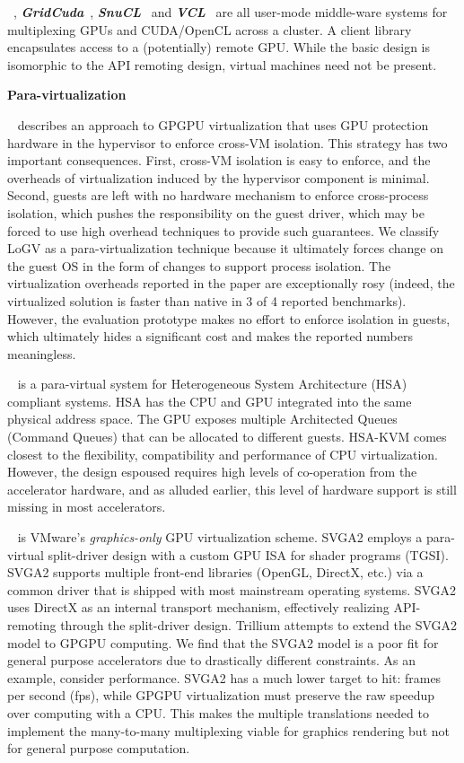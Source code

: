 ~\cite{rCUDA, rCUDAnew},
\textbf{\textit{GridCuda}}~\cite{GridCuda},
\textbf{\textit{SnuCL}}~\cite{kim2012snucl} and
\textbf{\textit{VCL}}~\cite{VCL} are all user-mode middle-ware systems for
multiplexing GPUs and CUDA/OpenCL across a cluster. A client library
encapsulates access to a (potentially) remote GPU. While the basic design is
isomorphic to the API remoting design, virtual machines need not be present.

{\noindent \bf \large Para-virtualization}

~\cite{logv} describes an approach to GPGPU virtualization
that uses GPU protection hardware in the hypervisor to enforce cross-VM
isolation. This strategy has two important consequences. First, cross-VM
isolation is easy to enforce, and the overheads of virtualization induced by
the hypervisor component is minimal. Second, guests are left with no hardware
mechanism to enforce cross-process isolation, which pushes the responsibility
on the guest driver, which may be forced to use high overhead techniques to
provide such guarantees. We classify LoGV as a para-virtualization technique
because it ultimately forces change on the guest OS in the form of changes to
support process isolation. The virtualization overheads reported in the paper
are exceptionally rosy (indeed, the virtualized solution is faster than native
in 3 of 4 reported benchmarks). However, the evaluation prototype makes no
effort to enforce isolation in guests, which ultimately hides a significant
cost and makes the reported numbers meaningless.

~\cite{kaveri16vee} is a para-virtual system for
Heterogeneous System Architecture (HSA) compliant systems. HSA has the CPU and
GPU integrated into the same physical address space. The GPU exposes multiple
Architected Queues (Command Queues) that can be allocated to different guests.
HSA-KVM comes closest to the flexibility, compatibility and performance of CPU
virtualization. However, the design espoused requires high levels of
co-operation from the accelerator hardware, and as alluded earlier, this level
of hardware support is still missing in most accelerators.

~\cite{dowty2009gpu} is VMware's \emph{graphics-only} GPU
virtualization scheme. SVGA2 employs a para-virtual split-driver design with a
custom GPU ISA for shader programs (TGSI). SVGA2 supports multiple front-end
libraries (OpenGL, DirectX, etc.) via a common driver that is shipped with
most mainstream operating systems. SVGA2 uses DirectX as an internal transport
mechanism, effectively realizing API-remoting through the split-driver design.
Trillium attempts to extend the SVGA2 model to GPGPU computing. We find that
the SVGA2 model is a poor fit for general purpose accelerators due to
drastically different constraints. As an example, consider performance. SVGA2
has a much lower target to hit: frames per second (fps), while GPGPU
virtualization must preserve the raw speedup over computing with a CPU.
This makes the multiple translations needed to implement the many-to-many
multiplexing viable for graphics rendering but not for general purpose
computation.

